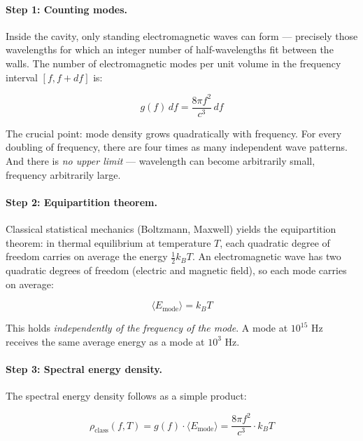 \paragraph{Step 1: Counting modes.}
Inside the cavity, only standing electromagnetic waves can form — precisely those 
wavelengths for which an integer number of half-wavelengths fit between the walls. 
The number of electromagnetic modes per unit volume in the frequency interval 
$[f, f + df]$ is:

\begin{equation}
    g(f) \, df = \frac{8\pi f^2}{c^3} \, df
    \label{eq:mode_density}
\end{equation}

The crucial point: mode density grows quadratically with frequency. For every 
doubling of frequency, there are four times as many independent wave patterns. 
And there is \emph{no upper limit} — wavelength can become arbitrarily small, 
frequency arbitrarily large.

\paragraph{Step 2: Equipartition theorem.}
Classical statistical mechanics (Boltzmann, Maxwell) yields the equipartition 
theorem: in thermal equilibrium at temperature $T$, each quadratic degree of freedom 
carries on average the energy $\frac{1}{2} k_B T$. An electromagnetic wave has two 
quadratic degrees of freedom (electric and magnetic field), so each mode carries on 
average:

\begin{equation}
    \langle E_{\text{mode}} \rangle = k_B T
    \label{eq:equipartition}
\end{equation}

This holds \emph{independently of the frequency of the mode}. A mode at $10^{15}$ Hz 
receives the same average energy as a mode at $10^3$ Hz.

\paragraph{Step 3: Spectral energy density.}
The spectral energy density follows as a simple product:

\begin{equation}
    \rho_{\text{class}}(f, T) = g(f) \cdot \langle E_{\text{mode}} \rangle 
    = \frac{8\pi f^2}{c^3} \cdot k_B T
    \label{eq:rayleigh_jeans}
\end{equation}

